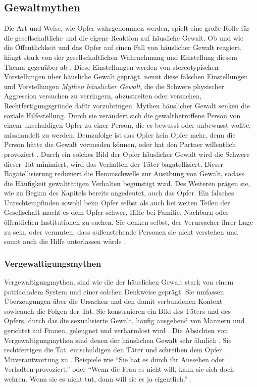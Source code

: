 \subsection{Gewaltmythen}   \label{subsec_2.1.3}
Die Art und Weise, wie Opfer wahrgenommen werden, spielt eine große Rolle für die gesellschaftliche und die eigene Reaktion auf häusliche Gewalt. Ob und wie die Öffentlichkeit und das Opfer auf einen Fall von häuslicher Gewalt reagiert, hängt stark von der gesellschaftlichen Wahrnehmung und Einstellung diesem Thema gegenüber ab \parencite{Labelingtheory_plus}. Diese Einstellungen werden von stereotypischen Vorstellungen über häusliche Gewalt geprägt. \textcite{DVMAS_Peters} nennt diese falschen Einstellungen und Vorstellungen \textit{Mythen häuslicher Gewalt}, die die Schwere physischer Aggression versuchen zu verringern, abzustreiten oder versuchen, Rechtfertigungsgründe dafür vorzubringen. Mythen häuslicher Gewalt senken die soziale Hilfestellung. Durch sie verändert sich die gewaltbetroffene Person von einem unschuldigen Opfer zu einer Person, die es bewusst oder unbewusst wollte, misshandelt zu werden. Demzufolge ist das Opfer kein Opfer mehr, denn die Person hätte die Gewalt vermeiden können, oder hat den Partner willentlich provoziert \parencite{DVMAS_Peters}. Durch ein solches Bild der Opfer häuslicher Gewalt wird die Schwere dieser Tat minimiert, wird das Verhalten der Täter bagatellisiert. Dieser Bagatellisierung reduziert die Hemmschwelle zur Ausübung von Gewalt, sodass die Häufigkeit gewalttätigen Verhalten begünstigt wird. Des Weiteren prägen sie, wie zu Beginn des Kapitels bereits angedeutet, auch das Opfer. Ein falsches Unrechtempfinden sowohl beim Opfer selbst als auch bei weiten Teilen der Gesellschaft macht es dem Opfer schwer, Hilfe bei Familie, Nachbarn oder öffentlichen Institutionen zu suchen. Sie denken selbst, der Verursacher ihrer Lage zu sein, oder vermuten, dass außenstehende Personen sie nicht verstehen und somit auch die Hilfe unterlassen würde \parencite{Gewaltmythen}.

\subsubsection{Vergewaltigungsmythen}  \label{2.1.3.1}
Vergewaltigungmythen, sind wie die der häuslichen Gewalt stark von einem patriachalem System und einer solchen Denkweise geprägt. Sie umfassen Überzeugungen über die Ursachen und den damit verbundenen Kontext sowieauch die Folgen der Tat. Sie konstruieren ein Bild des Täters und des Opfers, durch das die sexualisierte Gewalt, häufig ausgehend von Männern und gerichtet auf Frauen, geleugnet und verharmlost wird \parencite{Vergewaltigung_Bohner_1996}. Die Absichten von Vergewaltigungmythen sind denen der häuslichen Gewalt sehr ähnlich \parencite{DVMAS_Peters}. Sie rechtfertigen die Tat, entschuldigen den Täter und schreiben dem Opfer Mitverantwortung zu \parencite{Vergewaltigung_Boris_2004}. Beispiele wie \enquote{Sie hat es durch ihr Aussehen oder Verhalten provoziert.} oder \enquote{Wenn die Frau es nicht will, kann sie sich doch wehren. Wenn sie es nicht tut, dann will sie es ja eigentlich.} \parencite{Vergewaltigung_Boris_2004}.

